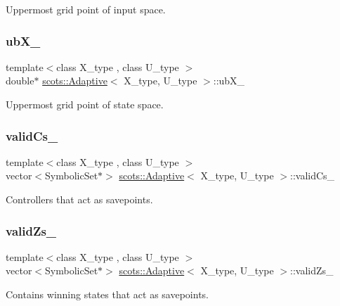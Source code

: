 Uppermost grid point of input space. \mbox{\label{classscots_1_1Adaptive_ac50c58c4495d727acdb321a0b995426b}} 
\subsubsection{\texorpdfstring{ub\+X\+\_\+}{ubX\_}}
{\footnotesize\ttfamily template$<$class X\+\_\+type , class U\+\_\+type $>$ \\
double$\ast$ \hyperlink{classscots_1_1Adaptive}{scots\+::\+Adaptive}$<$ X\+\_\+type, U\+\_\+type $>$\+::ub\+X\+\_\+}

Uppermost grid point of state space. \mbox{\label{classscots_1_1Adaptive_ad470ad33182f03ad7b3dd5fe9e5271d5}} 
\subsubsection{\texorpdfstring{valid\+Cs\+\_\+}{validCs\_}}
{\footnotesize\ttfamily template$<$class X\+\_\+type , class U\+\_\+type $>$ \\
vector$<$Symbolic\+Set$\ast$$>$ \hyperlink{classscots_1_1Adaptive}{scots\+::\+Adaptive}$<$ X\+\_\+type, U\+\_\+type $>$\+::valid\+Cs\+\_\+}

Controllers that act as savepoints. \mbox{\label{classscots_1_1Adaptive_af160394c89efaa08d8830a1df066586d}} 
\subsubsection{\texorpdfstring{valid\+Zs\+\_\+}{validZs\_}}
{\footnotesize\ttfamily template$<$class X\+\_\+type , class U\+\_\+type $>$ \\
vector$<$Symbolic\+Set$\ast$$>$ \hyperlink{classscots_1_1Adaptive}{scots\+::\+Adaptive}$<$ X\+\_\+type, U\+\_\+type $>$\+::valid\+Zs\+\_\+}

Contains winning states that act as savepoints. \mbox{\label{classscots_1_1Adaptive_a532d1acf3db0235c7bbd551b41a040fc}} 

